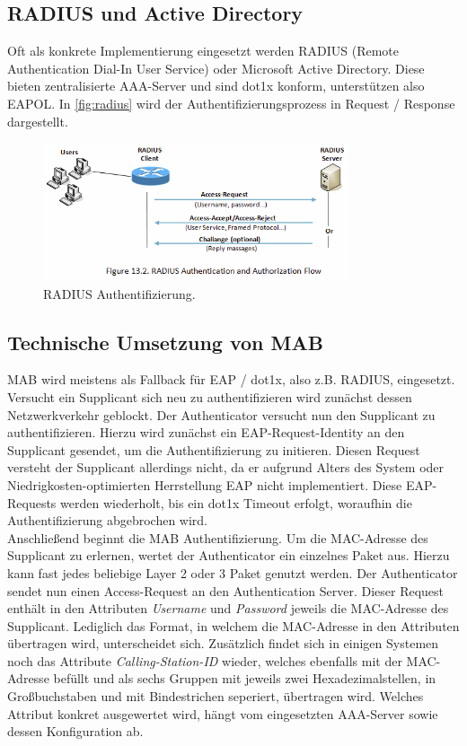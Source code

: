 \documentclass[conference]{IEEEtran}
\begin{document}
\subsection{RADIUS und Active Directory}
Oft als konkrete Implementierung eingesetzt werden RADIUS (Remote Authentication Dial-In User Service) oder Microsoft Active Directory. Diese bieten zentralisierte AAA-Server und sind dot1x konform, unterstützen also EAPOL. In \autoref{fig:radius} wird der Authentifizierungsprozess in Request / Response dargestellt.

\begin{figure}[hbt]
	\centering
	\includegraphics[width=9cm]{figures/radius}
	\caption{RADIUS Authentifizierung.}
	\label{fig:radius}
\end{figure}

\subsection{Technische Umsetzung von MAB}
MAB wird meistens als Fallback für EAP / dot1x, also z.B. RADIUS, eingesetzt. Versucht ein Supplicant sich neu zu authentifizieren wird zunächst dessen Netzwerkverkehr geblockt. Der Authenticator versucht nun den Supplicant zu authentifizieren. Hierzu wird zunächst ein EAP-Request-Identity an den Supplicant gesendet, um die Authentifizierung zu initieren. Diesen Request versteht der Supplicant allerdings nicht, da er aufgrund Alters des System oder Niedrigkosten-optimierten Herrstellung EAP nicht implementiert. Diese EAP-Requests werden wiederholt, bis ein dot1x Timeout erfolgt, woraufhin die Authentifizierung abgebrochen wird.\\

Anschließend beginnt die MAB Authentifizierung. Um die MAC-Adresse des Supplicant zu erlernen, wertet der Authenticator ein einzelnes Paket aus. Hierzu kann fast jedes beliebige Layer 2 oder 3 Paket genutzt werden. Der Authenticator sendet nun einen Access-Request an den Authentication Server. Dieser Request enthält in den Attributen \emph{Username} und \emph{Password} jeweils die MAC-Adresse des Supplicant. Lediglich das Format, in welchem die MAC-Adresse in den Attributen übertragen wird, unterscheidet sich. Zusätzlich findet sich in einigen Systemen noch das Attribute \emph{Calling-Station-ID} wieder, welches ebenfalls mit der MAC-Adresse befüllt und als sechs Gruppen mit jeweils zwei Hexadezimalstellen, in Großbuchstaben und mit Bindestrichen seperiert, übertragen wird. Welches Attribut konkret ausgewertet wird, hängt vom eingesetzten AAA-Server sowie dessen Konfiguration ab.\\
\end{document}
